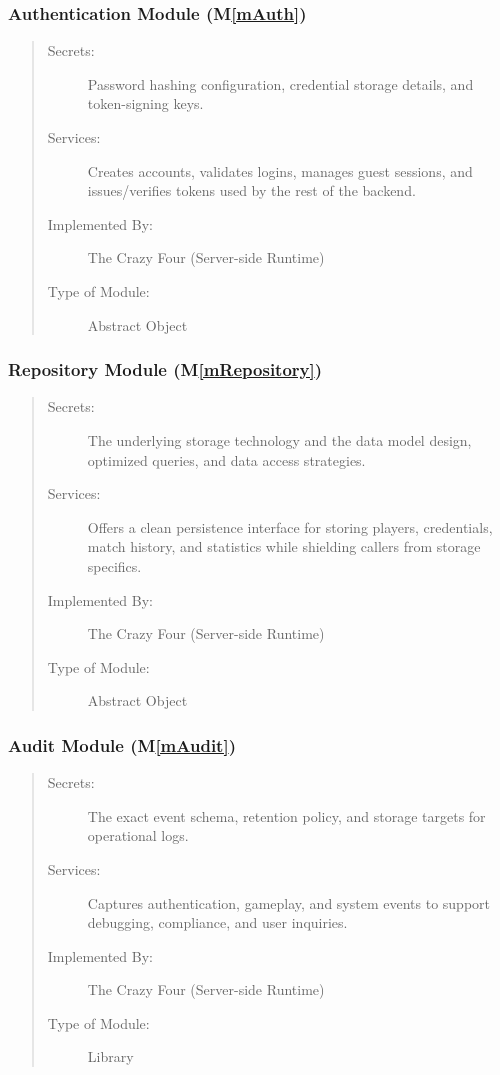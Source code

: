 \documentclass[12pt, titlepage]{article}
\newcommand{\mref}[1]{M\ref{#1}}
\begin{document}
\subsubsection{Authentication Module (\mref{mAuth})}
\begin{quote}
\begin{description}
  \item[Secrets:] Password hashing configuration, credential storage details, and token-signing keys.
  \item[Services:] Creates accounts, validates logins, manages guest sessions, and issues/verifies tokens used by the rest of the backend.
  \item[Implemented By:] The Crazy Four (Server-side Runtime)
  \item[Type of Module:] Abstract Object
\end{description}
\end{quote}

\subsubsection{Repository Module (\mref{mRepository})}
\begin{quote}
\begin{description}
  \item[Secrets:] The underlying storage technology and the data model design, optimized queries, and data access strategies.
  \item[Services:] Offers a clean persistence interface for storing players, credentials, match history, and statistics while shielding callers from storage specifics.
  \item[Implemented By:] The Crazy Four (Server-side Runtime)
  \item[Type of Module:] Abstract Object
\end{description}
\end{quote}

\subsubsection{Audit Module (\mref{mAudit})}
\begin{quote}
\begin{description}
  \item[Secrets:] The exact event schema, retention policy, and storage targets for operational logs.
  \item[Services:] Captures authentication, gameplay, and system events to support debugging, compliance, and user inquiries.
  \item[Implemented By:] The Crazy Four (Server-side Runtime)
  \item[Type of Module:] Library
\end{description}
\end{quote}
\end{document}
